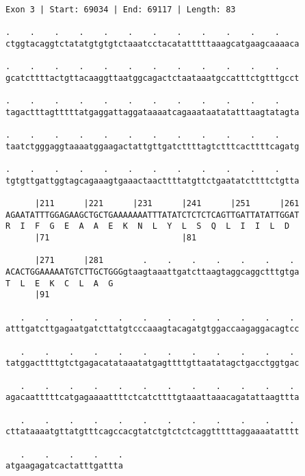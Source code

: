 \documentclass{article}
\begin{document}
\begin{Verbatim}
Exon 3 | Start: 69034 | End: 69117 | Length: 83
 
.    .    .    .    .    .    .    .    .    .    .    .    
ctggtacaggtctatatgtgtgtctaaatcctacatatttttaaagcatgaagcaaaaca
  
.    .    .    .    .    .    .    .    .    .    .    .    
gcatcttttactgttacaaggttaatggcagactctaataaatgccatttctgtttgcct
  
.    .    .    .    .    .    .    .    .    .    .    .    
tagactttagtttttatgaggattaggataaaatcagaaataatatatttaagtatagta
  
.    .    .    .    .    .    .    .    .    .    .    .    
taatctgggaggtaaaatggaagactattgttgatcttttagtctttcacttttcagatg
  
.    .    .    .    .    .    .    .    .    .    .    .    
tgtgttgattggtagcagaaagtgaaactaacttttatgttctgaatatcttttctgtta
  
      |211      |221      |231      |241      |251      |261
AGAATATTTGGAGAAGCTGCTGAAAAAAATTTATATCTCTCTCAGTTGATTATATTGGAT
R  I  F  G  E  A  A  E  K  N  L  Y  L  S  Q  L  I  I  L  D  
      |71                           |81                     
  
      |271      |281        .    .    .    .    .    .    . 
ACACTGGAAAAATGTCTTGCTGGGgtaagtaaattgatcttaagtaggcaggctttgtga
T  L  E  K  C  L  A  G                                      
      |91                                                   
  
   .    .    .    .    .    .    .    .    .    .    .    . 
atttgatcttgagaatgatcttatgtcccaaagtacagatgtggaccaagaggacagtcc
  
   .    .    .    .    .    .    .    .    .    .    .    . 
tatggacttttgtctgagacatataaatatgagttttgttaatatagctgacctggtgac
  
   .    .    .    .    .    .    .    .    .    .    .    . 
agacaatttttcatgagaaaattttctcatcttttgtaaattaaacagatattaagttta
  
   .    .    .    .    .    .    .    .    .    .    .    . 
cttataaaatgttatgtttcagccacgtatctgtctctcaggtttttaggaaaatatttt
  
   .    .    .    .    .
atgaagagatcactatttgattta
\end{Verbatim}
\newpage
\end{document}
